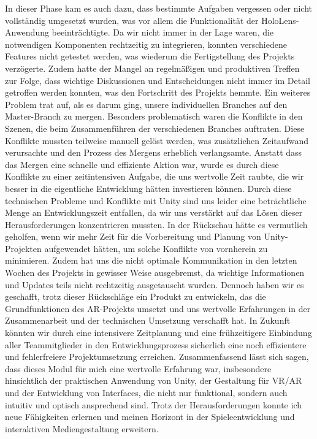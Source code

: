 \documentclass[11pt]{article}
\begin{document}
    In dieser Phase kam es auch dazu, dass bestimmte Aufgaben vergessen oder nicht vollständig umgesetzt wurden, was vor allem die Funktionalität der HoloLens-Anwendung beeinträchtigte. Da wir nicht immer in der Lage waren, die notwendigen Komponenten rechtzeitig zu integrieren, konnten verschiedene Features nicht getestet werden, was wiederum die Fertigstellung des Projekts verzögerte. Zudem hatte der Mangel an regelmäßigen und produktiven Treffen zur Folge, dass wichtige Diskussionen und Entscheidungen nicht immer im Detail getroffen werden konnten, was den Fortschritt des Projekts hemmte.
    Ein weiteres Problem trat auf, als es darum ging, unsere individuellen Branches auf den Master-Branch zu mergen. Besonders problematisch waren die Konflikte in den Szenen, die beim Zusammenführen der verschiedenen Branches auftraten. Diese Konflikte mussten teilweise manuell gelöst werden, was zusätzlichen Zeitaufwand verursachte und den Prozess des Mergens erheblich verlangsamte. Anstatt dass das Mergen eine schnelle und effiziente Aktion war, wurde es durch diese Konflikte zu einer zeitintensiven Aufgabe, die uns wertvolle Zeit raubte, die wir besser in die eigentliche Entwicklung hätten investieren können.
    Durch diese technischen Probleme und Konflikte mit Unity sind uns leider eine beträchtliche Menge an Entwicklungszeit entfallen, da wir uns verstärkt auf das Lösen dieser Herausforderungen konzentrieren mussten. In der Rückschau hätte es vermutlich geholfen, wenn wir mehr Zeit für die Vorbereitung und Planung von Unity-Projekten aufgewendet hätten, um solche Konflikte von vornherein zu minimieren. Zudem hat uns die nicht optimale Kommunikation in den letzten Wochen des Projekts in gewisser Weise ausgebremst, da wichtige Informationen und Updates teils nicht rechtzeitig ausgetauscht wurden.
    Dennoch haben wir es geschafft, trotz dieser Rückschläge ein Produkt zu entwickeln, das die Grundfunktionen des AR-Projekts umsetzt und uns wertvolle Erfahrungen in der Zusammenarbeit und der technischen Umsetzung verschafft hat. In Zukunft könnten wir durch eine intensivere Zeitplanung und eine frühzeitigere Einbindung aller Teammitglieder in den Entwicklungsprozess sicherlich eine noch effizientere und fehlerfreiere Projektumsetzung erreichen.
    Zusammenfassend lässt sich sagen, dass dieses Modul für mich eine wertvolle Erfahrung war, insbesondere hinsichtlich der praktischen Anwendung von Unity, der Gestaltung für VR/AR und der Entwicklung von Interfaces, die nicht nur funktional, sondern auch intuitiv und optisch ansprechend sind. Trotz der Herausforderungen konnte ich neue Fähigkeiten erlernen und meinen Horizont in der Spieleentwicklung und interaktiven Mediengestaltung erweitern.
\end{document}

